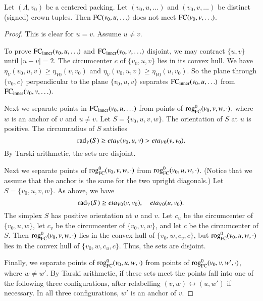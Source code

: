\begin{lemma}
Let $(\Lambda,v_0)$ be a centered packing.  Let $(v_0,u,\ldots)$
and $(v_0,v,\ldots)$ be distinct (signed) crown tuples.
Then ${\operatorname{FC}}(v_0,u,\ldots)$ does not meet ${\operatorname{FC}}(v_0,v,\ldots)$.
\end{lemma}

\begin{proof}
This is clear for  $u=v$.  Assume $u\ne v$.  

To prove ${\operatorname{FC}}_{\text{inner}}(v_0,u,\ldots)$ and ${\operatorname{FC}}_{\text{inner}}(v_0,v,\ldots)$
disjoint, we
may contract $\{u,v\}$ until $|u-v|=2$. The circumcenter $c$ of 
$\{v_0,u,v\}$ lies
in its convex hull.  We have $\eta_V(v_0,u,v)\ge
\eta_{V0}(v,v_0)$ and $\eta_V(v_0,u,v)\ge\eta_{V0}(u,v_0)$.  So the plane
through $\{v_0,c\}$ perpendicular to the plane $\{v_0,u,v\}$ separates
${\operatorname{FC}}_{\text{inner}}(v_0,u,\ldots)$ from ${\operatorname{FC}}_{\text{inner}}(v_0,v,\ldots)$.

Next we separate points in ${\operatorname{FC}}_{\text{inner}}(v_0,u,\ldots)$ from points of
${\operatorname{rog}}^0_{\text{FC}}(v_0,v,w,\cdot)$, where $w$ is an anchor of $v$ and $u\ne v$.  Let
$S=\{v_0,u,v,w\}$. The orientation of $S$ at $u$  is
positive.  The circumradius of $S$ satisfies
    $$
    \operatorname{rad}_V(S) \ge eta_V(v_0,u,v)>eta_{V0}(v,v_0).
    $$
By Tarski arithmetic, 
the sets are disjoint.

Next we separate points of ${\operatorname{rog}}^0_{\text{FC}}(v_0,v,w,\cdot)$ from 
${\operatorname{rog}}^0_{\text{FC}}(v_0,u,w,\cdot)$.  (Notice
that we assume that the anchor is the same for the two upright diagonals.)
Let $S=\{v_0,u,v,w\}$.   As above, we have
    $$
    \operatorname{rad}_V(S) \ge eta_{V0}(v,v_0), \quad eta_{V0}(u,v_0).
    $$
The simplex $S$ has positive orientation at $u$ and $v$.  
Let $c_u$ be the circumcenter of
$\{v_0,u,w\}$, let $c_v$ be the circumcenter of $\{v_0,v,w\}$, and let
$c$ be the circumcenter of $S$.  Then ${\operatorname{rog}}^0_{\text{FC}}(v_0,v,w,\cdot)$ lies in the
convex hull of $\{v_0,w,c_v,c\}$, but ${\operatorname{rog}}^0_{\text{FC}}(v_0,u,w,\cdot)$ lies in the convex
hull of $\{v_0,w,c_u,c\}$.  Thus, the sets are disjoint.



Finally, we separate points of ${\operatorname{rog}}^0_{\text{FC}}(v_0,u,w,\cdot)$ from points of
${\operatorname{rog}}^0_{\text{FC}}(v_0,v,w',\cdot)$,  where $w\ne w'$. 
By Tarski arithmetic, if these sets meet the points fall into
one of the following three configurations, after relabelling $(v,w)\leftrightarrow(u,w')$
if necessary.  In all three configurations, $w'$ is an anchor of $v$.


\end{proof}
